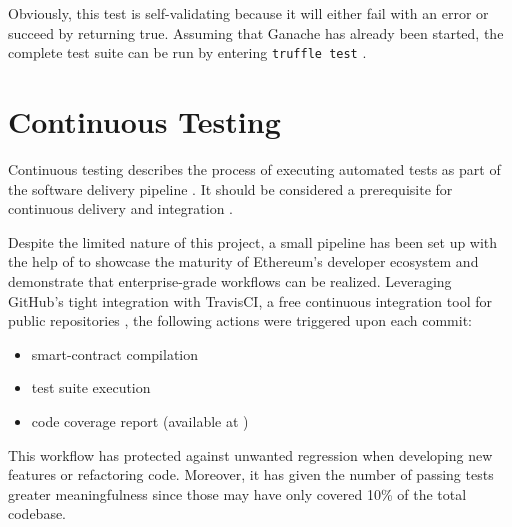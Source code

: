 Obviously, this test is self-validating because it will either fail with an error or succeed by returning true. Assuming that Ganache has already been started, the complete test suite can be run by entering \texttt{truffle test} \cite[Testing Your Contracts]{truffleSuite}. 

\pagebreak

\section{Continuous Testing}
Continuous testing describes the process of executing automated tests as part of the software delivery pipeline \cite{pipeline}. It should be considered a prerequisite for continuous delivery and integration \cite{continousTestingInterview}.

Despite the limited nature of this project, a small pipeline has been set up with the help of \cite{testingSolidity} to showcase the maturity of Ethereum's developer ecosystem and demonstrate that enterprise-grade workflows can be realized. Leveraging GitHub's tight integration with TravisCI, a free continuous integration tool for public repositories \cite{travisCIGitHub}, the following actions were triggered upon each commit:

\begin{itemize}
  \item smart-contract compilation
  \item test suite execution
  \item code coverage report (available at \cite{coverageReport})
\end{itemize}

This workflow has protected against unwanted regression when developing new features or refactoring code. Moreover, it has given the number of passing tests greater meaningfulness since those may have only covered 10\% of the total codebase.
